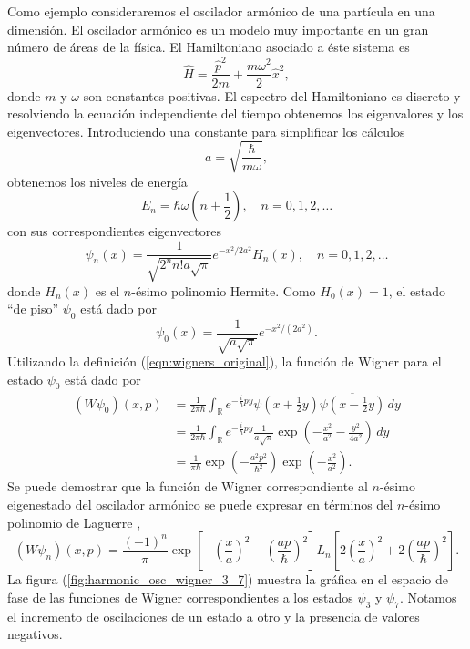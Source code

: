 \documentclass[a4paper]{report}
\DeclareMathOperator{\R}{\mathbb{R}}
\begin{document}
  Como ejemplo consideraremos el oscilador armónico de una
  partícula en una dimensión. El oscilador armónico es un
  modelo muy importante en un gran número de áreas de la
  física.  El Hamiltoniano asociado a éste sistema es
  \begin{equation}
    \hat{H}
    = \frac{\hat{p}^2}{2m} + \frac{m\omega^2}{2}
    \hat{x}^2,
  \end{equation}
  donde $m$ y $\omega$ son constantes positivas. El espectro
  del Hamiltoniano es discreto y resolviendo la ecuación
  independiente del tiempo obtenemos los eigenvalores y los
  eigenvectores. Introduciendo una constante para
  simplificar los cálculos
  \[
    a = \sqrt{\frac{\hbar}{m \omega}},
  \]
  obtenemos los niveles de energía
  \begin{equation}
    E_n
    = \hbar \omega \left( n + \frac{1}{2} \right),
    \quad n = 0,1,2,\ldots
  \end{equation}
  con sus correspondientes eigenvectores
  \begin{equation}
    \psi_n(x)
    = \frac{1}{\sqrt{2^{n} n! a \sqrt{\pi}}} e^{-x^2 / 2a^2}
    H_n(x),
    \quad n = 0, 1, 2,\ldots
  \end{equation}
  donde $H_n(x)$ es el $n$-ésimo polinomio Hermite.
  Como $H_0(x) = 1$, el estado ``de piso'' $\psi_0$ está
  dado por
  \[
    \psi_0(x)
    = \frac{1}{\sqrt{a \sqrt{\pi}}} e^{-x^2 / (2a^2)}.
  \]
  Utilizando la definición (\ref{eqn:wigners_original}), la
  función de Wigner para el estado $\psi_0$ está dado por
  \begin{align*}
    (W\psi_0)(x,p)
    &= \frac{1}{2\pi\hbar} \int_{\R} e^{-\frac{i}{\hbar} p y}
    \psi(x + \tfrac{1}{2}y) \overline{\psi(x -
    \tfrac{1}{2}y)} \, dy \\
    &= \frac{1}{2\pi\hbar} \int_{\R} e^{-\frac{i}{\hbar}py}
    \frac{1}{a\sqrt{\pi}}\exp\left( -\frac{x^2}{a^2} -
    \frac{y^2}{4a^2} \right)  \, dy \\
    &= \frac{1}{\pi\hbar} \exp\left( -\frac{a^2
    p^2}{\hbar^2} \right) \exp\left( -\frac{x^2}{a^2}
    \right). 
  \end{align*}
  Se puede demostrar que la función de Wigner
  correspondiente al $n$-ésimo eigenestado del oscilador
  armónico se puede expresar en términos del $n$-ésimo
  polinomio de Laguerre \cite{zachos2005}, 
  \[
    (W\psi_n)(x,p)
    = \frac{(-1)^{n}}{\pi} \exp\left[ -\left( \frac{x}{a}
    \right)^2 - \left( \frac{ap}{\hbar} \right)^2 \right]
    L_n\left[ 2\left( \frac{x}{a} \right)^2 + 2\left(
    \frac{ap}{\hbar} \right)^2 \right].
  \] 
  La figura (\ref{fig:harmonic_osc_wigner_3_7}) muestra la
  gráfica en el espacio de fase de las funciones de Wigner
  correspondientes a los estados $\psi_3$ y $\psi_7$.
  Notamos el incremento de oscilaciones de un estado a otro
  y la presencia de valores negativos.
  
\end{document}
